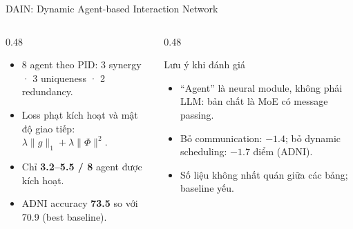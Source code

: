 \documentclass[aspectratio=169,10pt]{beamer}
\begin{document}
\begin{frame}{DAIN: Dynamic Agent-based Interaction Network}
  \centering
  \raggedright
  \begin{columns}[T]
    \begin{column}{0.48\textwidth}
      \begin{itemize}
        \item 8 agent theo PID: 3 synergy · 3 uniqueness · 2 redundancy.
        \item Loss phạt kích hoạt và mật độ giao tiếp: $\lambda\lVert g\rVert_1 + \lambda\lVert \Phi\rVert^2$.
        \item Chỉ \textbf{3.2--5.5 / 8} agent được kích hoạt.
        \item ADNI accuracy \textbf{73.5} so với 70.9 (best baseline).
      \end{itemize}
    \end{column}
    \begin{column}{0.48\textwidth}
      \begin{alertblock}{Lưu ý khi đánh giá}
        \begin{itemize}
          \item “Agent” là neural module, không phải LLM: bản chất là MoE có message passing.
          \item Bỏ communication: $-1.4$; bỏ dynamic scheduling: $-1.7$ điểm (ADNI).
          \item Số liệu không nhất quán giữa các bảng; baseline yếu.
        \end{itemize}
      \end{alertblock}
    \end{column}
  \end{columns}
\end{frame}
\end{document}

